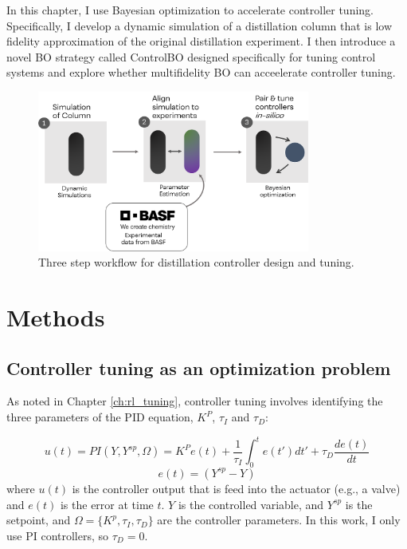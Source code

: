 In this chapter, I use Bayesian optimization to accelerate controller tuning. Specifically, I develop a dynamic simulation of a distillation column that is low fidelity approximation of the original distillation experiment. I then introduce a novel BO strategy called ControlBO designed specifically for tuning control systems and explore whether multifidelity BO can acceelerate controller tuning.

\begin{figure}
    \centering
    \includegraphics[width=0.8\textwidth]{gfx/Chapter06/tuning_workflow.png}
    \caption{Three step workflow for distillation controller design and tuning. }
    \label{fig:tuning_workflow}
\end{figure}

\section{Methods}

\subsection{Controller tuning as an optimization problem}

As noted in Chapter \ref{ch:rl_tuning}, controller tuning involves identifying the three parameters of the PID equation, $K^P$, $\tau_I$ and $\tau_D$:

\begin{equation}
    u(t) = PI(Y, Y^{sp}, \Omega) =  K^P e(t) + \frac{1}{\tau_I}\int_0^t e(t')dt' + \tau_D \frac{de(t)}{dt}
\end{equation}
\begin{equation}
    e(t) = (Y^{sp} - Y)
\end{equation}
where $u(t)$ is the controller output that is feed into the actuator (e.g., a valve) and $e(t)$ is the error at time $t$. $Y$ is the controlled variable, and $Y^{sp}$ is the setpoint, and $\Omega=\{K^p, \tau_I, \tau_D \}$ are the controller parameters. In this work, I only use PI controllers, so $\tau_D=0$.

